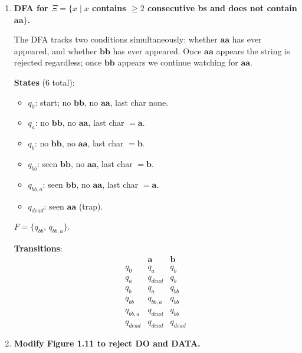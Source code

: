 \documentclass[11pt]{book}
\begin{document}
\begin{enumerate}[{1.}1.]
\begin{enumerate}
\item For a string of length $n$: the number of ways to choose split points $0\leq i\leq j\leq n$ is $\binom{n+2}{2} = \frac{(n+1)(n+2)}{2}$.
\end{enumerate}

\item \textbf{DFA for $\Xi = \{x\mid x$ contains $\geq 2$ consecutive \textbf{b}s and does not contain $\mathbf{aa}\}$.}

The DFA tracks two conditions simultaneously: whether $\mathbf{aa}$ has ever appeared, and whether $\mathbf{bb}$ has ever appeared. Once $\mathbf{aa}$ appears the string is rejected regardless; once $\mathbf{bb}$ appears we continue watching for $\mathbf{aa}$.

\medskip
\noindent\textbf{States} (6 total):
\begin{itemize}
  \item $q_0$: start; no $\mathbf{bb}$, no $\mathbf{aa}$, last char none.
  \item $q_a$: no $\mathbf{bb}$, no $\mathbf{aa}$, last char $= \mathbf{a}$.
  \item $q_b$: no $\mathbf{bb}$, no $\mathbf{aa}$, last char $= \mathbf{b}$.
  \item $q_{bb}$: seen $\mathbf{bb}$, no $\mathbf{aa}$, last char $= \mathbf{b}$.
  \item $q_{bb,a}$: seen $\mathbf{bb}$, no $\mathbf{aa}$, last char $= \mathbf{a}$.
  \item $q_{dead}$: seen $\mathbf{aa}$ (trap).
\end{itemize}
$F = \{q_{bb},\, q_{bb,a}\}.$

\medskip
\noindent\textbf{Transitions}:
\[
\begin{array}{c|cc}
       & \mathbf{a}    & \mathbf{b}    \\\hline
q_0    & q_a           & q_b           \\
q_a    & q_{dead}      & q_b           \\
q_b    & q_a           & q_{bb}        \\
q_{bb} & q_{bb,a}      & q_{bb}        \\
q_{bb,a} & q_{dead}    & q_{bb}        \\
q_{dead} & q_{dead}    & q_{dead}
\end{array}
\]

\item \textbf{Modify Figure 1.11 to reject DO and DATA.}


\end{enumerate}
\end{document}
